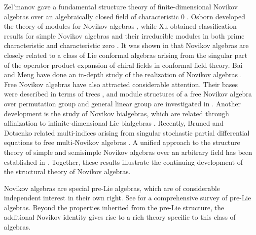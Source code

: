 \documentclass[12pt]{amsart}
\theoremstyle{definition}
\begin{document}
Zel'manov gave a fundamental structure theory of finite-dimensional Novikov algebras over an algebraically closed field of characteristic 0 \cite{Z}. Osborn developed the theory of modules for Novikov algebras \cite{O1995}, while Xu obtained classification results for simple Novikov algebras and their irreducible modules in both prime characteristic and characteristic zero \cite{XuXP1996,XuXP2001}.
It was shown in \cite{XuXP2000} that Novikov algebras are closely related to a class of Lie conformal algebras arising from the singular part of the operator product expansion of chiral fields in conformal field theory. Bai and Meng have done an in-depth study of the realization of Novikov algebras \cite{BaiM,BaiM2}. Free Novikov algebras have also attracted considerable attention. Their bases were described in terms of trees \cite{DL}, and module structures of a free Novikov algebra over permutation group and general linear group are investigated in \cite{DI}. Another development is the study of Novikov bialgebras, which are related through affinization to infinite-dimensional Lie bialgebras \cite{H-B-G}. Recently, Bruned and Dotsenko related multi-indices arising from singular stochastic partial differential equations to free multi-Novikov algebras \cite{Br-Do}. A unified approach to the structure theory of simple and semisimple Novikov algebras over an arbitrary field has been established in \cite{ZhP2025}. Together, these results illustrate the continuing development of the structural theory of Novikov algebras.

Novikov algebras are special pre-Lie algebras, which are of considerable independent interest in their own right. See  \cite{Bur} for a comprehensive survey of pre-Lie algebras. %
Beyond the properties inherited from the pre-Lie structure, the additional Novikov identity gives rise to a rich theory specific to this class of algebras.
\end{document}
